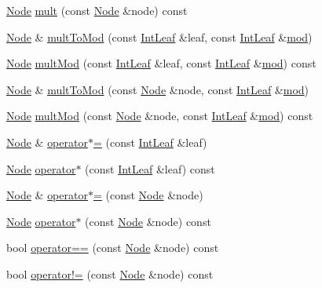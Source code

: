 \begin{DoxyCompactItemize}
\item 
\hyperlink{class_node}{Node} \hyperlink{class_node_a22afe59e2c925924d6472a6ffe3e5488}{mult} (const \hyperlink{class_node}{Node} \&node) const 
\item 
\hyperlink{class_node}{Node} \& \hyperlink{class_node_a24f08a59947b6ef5393823ddb47d5bde}{mult\-To\-Mod} (const \hyperlink{class_int_leaf}{Int\-Leaf} \&leaf, const \hyperlink{class_int_leaf}{Int\-Leaf} \&\hyperlink{class_node_a7744980c6da2415c02b583c5b149d50d}{mod})
\item 
\hyperlink{class_node}{Node} \hyperlink{class_node_a4e4c3d8ce4cd291c80b34a57eccdcfbc}{mult\-Mod} (const \hyperlink{class_int_leaf}{Int\-Leaf} \&leaf, const \hyperlink{class_int_leaf}{Int\-Leaf} \&\hyperlink{class_node_a7744980c6da2415c02b583c5b149d50d}{mod}) const 
\item 
\hyperlink{class_node}{Node} \& \hyperlink{class_node_a8a8d36cdd28616c89c5231f64eccb88b}{mult\-To\-Mod} (const \hyperlink{class_node}{Node} \&node, const \hyperlink{class_int_leaf}{Int\-Leaf} \&\hyperlink{class_node_a7744980c6da2415c02b583c5b149d50d}{mod})
\item 
\hyperlink{class_node}{Node} \hyperlink{class_node_add4a910a5d13cb0c43680de2e38d5758}{mult\-Mod} (const \hyperlink{class_node}{Node} \&node, const \hyperlink{class_int_leaf}{Int\-Leaf} \&\hyperlink{class_node_a7744980c6da2415c02b583c5b149d50d}{mod}) const 
\item 
\hyperlink{class_node}{Node} \& \hyperlink{class_node_acc1124101cc3bb6cfa486361d4593ef9}{operator$\ast$=} (const \hyperlink{class_int_leaf}{Int\-Leaf} \&leaf)
\item 
\hyperlink{class_node}{Node} \hyperlink{class_node_abf463388fe626c7412ebd03455b93d24}{operator$\ast$} (const \hyperlink{class_int_leaf}{Int\-Leaf} \&leaf) const 
\item 
\hyperlink{class_node}{Node} \& \hyperlink{class_node_a82be68d29507f13cd58d7a70678c745d}{operator$\ast$=} (const \hyperlink{class_node}{Node} \&node)
\item 
\hyperlink{class_node}{Node} \hyperlink{class_node_a74005185f7ea1724fb4891cd9df1e9ef}{operator$\ast$} (const \hyperlink{class_node}{Node} \&node) const 
\item 
bool \hyperlink{class_node_af167bfaab0f7e39daf0f39bb3d595e5f}{operator==} (const \hyperlink{class_node}{Node} \&node) const 
\item 
bool \hyperlink{class_node_aa2e7398fc0d99fe12c075bd94ee5543b}{operator!=} (const \hyperlink{class_node}{Node} \&node) const 
\item 

\end{DoxyCompactItemize}
